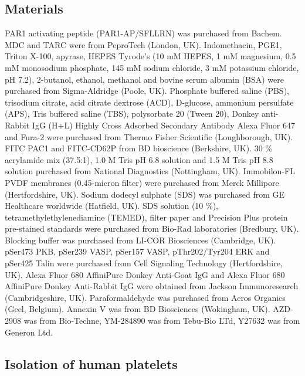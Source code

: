 \documentclass[11pt,twoside]{bristolthesis}
\begin{document}
\hypertarget{materials-1}{%
\subsection{Materials}\label{materials-1}}

PAR1 activating peptide (PAR1-AP/SFLLRN) was purchased from Bachem. MDC and TARC were from PeproTech (London, UK). Indomethacin, PGE1, Triton X-100, apyrase, HEPES Tyrode's (10 mM HEPES, 1 mM magnesium, 0.5 mM monosodium phosphate, 145 mM sodium chloride, 3 mM potassium chloride, pH 7.2), 2-butanol, ethanol, methanol and bovine serum albumin (BSA) were purchased from Sigma-Aldridge (Poole, UK). Phosphate buffered saline (PBS), trisodium citrate, acid citrate dextrose (ACD), D-glucose, ammonium persulfate (APS), Tris buffered saline (TBS), polysorbate 20 (Tween 20), Donkey anti-Rabbit IgG (H+L) Highly Cross Adsorbed Secondary Antibody Alexa Fluor 647 and Fura-2 were purchased from Thermo Fisher Scientific (Loughborough, UK). FITC PAC1 and FITC-CD62P from BD bioscience (Berkshire, UK). 30 \% acrylamide mix (37.5:1), 1.0 M Tris pH 6.8 solution and 1.5 M Tris pH 8.8 solution purchased from National Diagnostics (Nottingham, UK). Immobilon-FL PVDF membranes (0.45-micron filter) were purchased from Merck Millipore (Hertfordshire, UK). Sodium dodecyl sulphate (SDS) was purchased from GE Healthcare worldwide (Hatfield, UK). SDS solution (10 \%), tetramethylethylenediamine (TEMED), filter paper and Precision Plus protein pre-stained standards were purchased from Bio-Rad laboratories (Bredbury, UK). Blocking buffer was purchased from LI-COR Biosciences (Cambridge, UK). pSer473 PKB, pSer239 VASP, pSer157 VASP, pThr202/Tyr204 ERK and pSer425 Talin were purchased from Cell Signaling Technology (Hertfordshire, UK). Alexa Fluor 680 AffiniPure Donkey Anti-Goat IgG and Alexa Fluor 680 AffiniPure Donkey Anti-Rabbit IgG were obtained from Jackson Immunoresearch (Cambridgeshire, UK). Paraformaldehyde was purchased from Acros Organics (Geel, Belgium). Annexin V was from BD Biosciences (Wokingham, UK). AZD-2908 was from Bio-Techne, YM-284890 was from Tebu-Bio LTd, Y27632 was from Generon Ltd.

\hypertarget{isolation-of-human-platelets}{%
\subsection{Isolation of human platelets}\label{isolation-of-human-platelets}}
\end{document}
